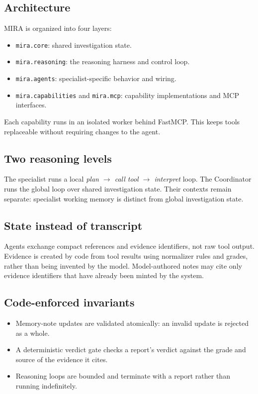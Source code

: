 \documentclass[11pt,a4paper]{article}
\newcommand{\code}[1]{\texttt{\small #1}}
\begin{document}
\subsection{Architecture}
MIRA is organized into four layers:
\begin{itemize}
  \item \code{mira.core}: shared investigation state.
  \item \code{mira.reasoning}: the reasoning harness and control loop.
  \item \code{mira.agents}: specialist-specific behavior and wiring.
  \item \code{mira.capabilities} and \code{mira.mcp}: capability implementations and MCP interfaces.
\end{itemize}
Each capability runs in an isolated worker behind FastMCP. This keeps tools replaceable without requiring changes to the agent.

\subsection{Two reasoning levels}
The specialist runs a local \emph{plan $\rightarrow$ call tool $\rightarrow$ interpret} loop. The Coordinator runs the global loop over shared investigation state. Their contexts remain separate: specialist working memory is distinct from global investigation state.

\subsection{State instead of transcript}
Agents exchange compact references and evidence identifiers, not raw tool output. Evidence is created by code from tool results using normalizer rules and grades, rather than being invented by the model. Model-authored notes may cite only evidence identifiers that have already been minted by the system.

\subsection{Code-enforced invariants}
\begin{itemize}
  \item Memory-note updates are validated atomically: an invalid update is rejected as a whole.
  \item A deterministic verdict gate checks a report's verdict against the grade and source of the evidence it cites.
  \item Reasoning loops are bounded and terminate with a report rather than running indefinitely.
\end{itemize}
\end{document}
